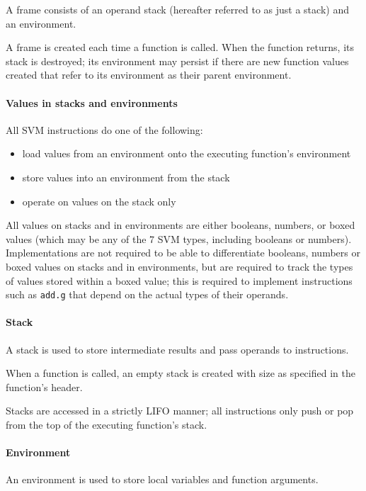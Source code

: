 A frame consists of an operand stack (hereafter referred to as just a
stack) and an environment.

A frame is created each time a function is called. When the function
returns, its stack is destroyed; its environment may persist if there
are new function values created that refer to its environment as their
parent environment.

\paragraph{Values in stacks and environments}

All SVM instructions do one of the following:

\begin{itemize}
\item
  load values from an environment onto the executing function's
  environment
\item
  store values into an environment from the stack
\item
  operate on values on the stack only
\end{itemize}

All values on stacks and in environments are either booleans, numbers,
or boxed values (which may be any of the 7 SVM types, including booleans
or numbers). Implementations are not required to be able to
differentiate booleans, numbers or boxed values on stacks and in
environments, but are required to track the types of values stored
within a boxed value; this is required to implement instructions such as
\texttt{add.g} that depend on the actual types of their operands.

\paragraph{Stack}

A stack is used to store intermediate results and pass operands to
instructions.

When a function is called, an empty stack is created with size as
specified in the function's header.

Stacks are accessed in a strictly LIFO manner; all instructions only
push or pop from the top of the executing function's stack.

\paragraph{Environment}

An environment is used to store local variables and function arguments.

